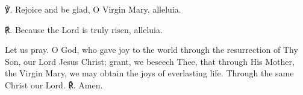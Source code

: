 \begin{otherlanguage}{english}


℣. Rejoice and be glad, O Virgin Mary, alleluia.

℟. Because the Lord is truly risen, alleluia.

Let us pray. O God, who gave joy to the world through the resurrection of Thy Son, our Lord Jesus Christ; grant, we beseech Thee, that through His Mother, the Virgin Mary, we may obtain the joys of everlasting life. Through the same Christ our Lord. ℟. Amen.
\end{otherlanguage}